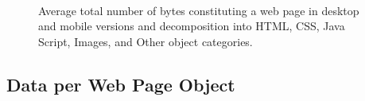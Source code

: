 \documentclass[onecolumn,12pt]{IEEEtran}
\begin{document}
\begin{figure}
	\\
	\caption{Average total number of bytes constituting a web page in desktop and mobile versions and decomposition into  HTML, CSS, Java Script, Images, and Other object categories.\label{fig:sizes}}
\end{figure}

\newpage
\subsection{Data per Web Page Object}
\end{document}
